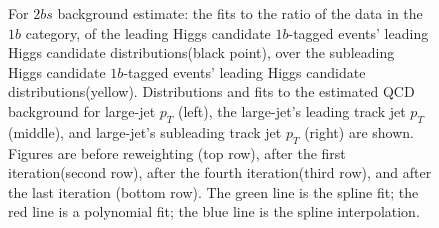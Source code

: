 \begin{figure}[htbp!]
\begin{center}
\caption{For $2bs$ background estimate: the fits to the ratio of the data in the $1b$ category, of the leading Higgs candidate $1b$-tagged events' leading Higgs candidate distributions(black point), over the subleading Higgs candidate $1b$-tagged events' leading Higgs candidate distributions(yellow). Distributions and fits to the estimated QCD background for large-\R jet $p_{T}$ (left),  the large-\R jet's leading track jet $p_T$ (middle), and large-\R jet's subleading track jet $p_T$ (right) are shown.  Figures are before reweighting (top row), after the first iteration(second row), after the fourth iteration(third row), and after the last iteration (bottom row). The green line is the spline fit; the red line is a polynomial fit; the blue line is the spline interpolation.}
\label{fig:rw-2bs-subl}
\end{center}
\end{figure}

